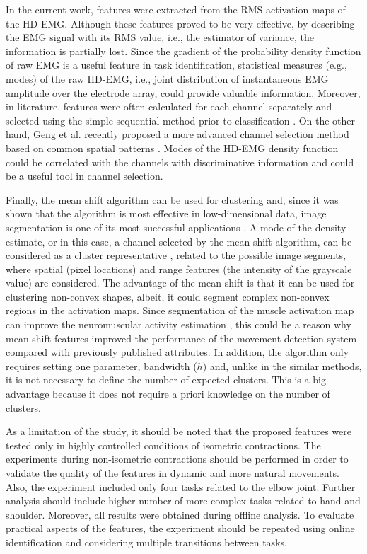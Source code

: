 In the current work, features were extracted from the RMS activation maps of the HD-EMG. Although these features proved to be very effective, by describing the EMG signal with its RMS value, i.e., the estimator of variance, the information is partially lost. Since the gradient of the probability density function of raw EMG is a useful feature in task identification, statistical measures (e.g., modes) of the raw HD-EMG, i.e., joint distribution of instantaneous EMG amplitude over the electrode array, could provide valuable information. Moreover, in literature, features were often calculated for each channel separately and selected using the simple sequential method prior to classification \citep{Hargrove2009, Li2017}. On the other hand, Geng et al. recently proposed a more advanced channel selection method based on common spatial patterns \citep{Geng2014}. Modes of the HD-EMG density function could be correlated with the channels with discriminative information and could be a useful tool in channel selection.

Finally, the mean shift algorithm can be used for clustering and, since it was shown that the algorithm is most effective in low-dimensional data, image segmentation is one of its most successful applications \citep{Comaniciu2002}. A mode of the density estimate, or in this case, a channel selected by the mean shift algorithm, can be considered as a cluster representative \citep{Hennig2015}, related to the possible image segments, where spatial (pixel locations) and range features (the intensity of the grayscale value) are considered. The advantage of the mean shift is that it can be used for clustering non-convex shapes, albeit, it could segment complex non-convex regions in the activation maps. Since segmentation of the muscle activation map can improve the neuromuscular activity estimation \citep{Vieira2010}, this could be a reason why mean shift features improved the performance of the movement detection system compared with previously published attributes. In addition, the algorithm only requires setting one parameter, bandwidth ($h$) and, unlike in the similar methods, it is not necessary to define the number of expected clusters. This is a big advantage because it does not require a priori knowledge on the number of clusters.

As a limitation of the study, it should be noted that the proposed features were tested only in highly controlled conditions of isometric contractions. The experiments during non-isometric contractions should be performed in order to validate the quality of the features in dynamic and more natural movements. Also, the experiment included only four tasks related to the elbow joint. Further analysis should include higher number of more complex tasks related to hand and shoulder. Moreover, all results were obtained during offline analysis. To evaluate practical aspects of the features, the experiment should be repeated using online identification and considering multiple transitions between tasks.


